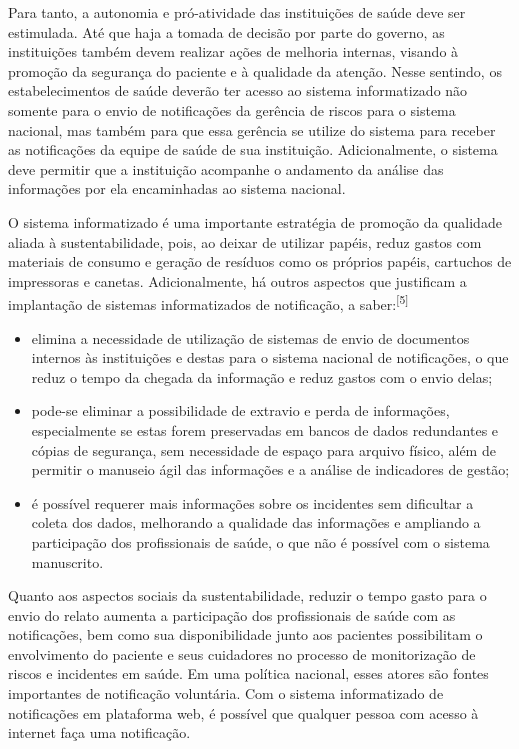 \documentclass{article}
\begin{document}
Para tanto, a autonomia e pró-atividade das instituições de saúde deve ser
estimulada. Até
que haja a tomada de decisão por parte do governo, as instituições também devem
realizar
ações de melhoria internas, visando à promoção da segurança do paciente e à
qualidade da
atenção. Nesse sentindo, os estabelecimentos de saúde deverão ter acesso ao
sistema
informatizado não somente para o envio de notificações da gerência de riscos
para o sistema
nacional, mas também para que essa gerência se utilize do sistema para receber
as
notificações da equipe de saúde de sua instituição. Adicionalmente, o sistema
deve permitir
que a instituição acompanhe o andamento da análise das informações por ela
encaminhadas ao
sistema nacional.

O sistema informatizado é uma importante estratégia de promoção da qualidade
aliada à
sustentabilidade, pois, ao deixar de utilizar papéis, reduz gastos com materiais
de consumo
e geração de resíduos como os próprios papéis, cartuchos de impressoras e
canetas.
Adicionalmente, há outros aspectos que justificam a implantação de sistemas
informatizados
de notificação, a saber:\textsuperscript{[}\textsuperscript{5}\textsuperscript{]}

\begin{itemize}
\item
elimina a necessidade de utilização de sistemas de envio de documentos internos
às
instituições e destas para o sistema nacional de notificações, o que reduz o
tempo da
chegada da informação e reduz gastos com o envio delas;

\item
pode-se eliminar a possibilidade de extravio e perda de informações,
especialmente se
estas forem preservadas em bancos de dados redundantes e cópias de segurança,
sem
necessidade de espaço para arquivo físico, além de permitir o manuseio ágil das
informações e a análise de indicadores de gestão;

\item
é possível requerer mais informações sobre os incidentes sem dificultar a coleta
dos
dados, melhorando a qualidade das informações e ampliando a participação dos
profissionais de saúde, o que não é possível com o sistema manuscrito.

\end{itemize}

Quanto aos aspectos sociais da sustentabilidade, reduzir o tempo gasto para o
envio do
relato aumenta a participação dos profissionais de saúde com as notificações,
bem como sua
disponibilidade junto aos pacientes possibilitam o envolvimento do paciente e
seus
cuidadores no processo de monitorização de riscos e incidentes em saúde. Em uma
política
nacional, esses atores são fontes importantes de notificação voluntária. Com o
sistema
informatizado de notificações em plataforma web, é possível que qualquer pessoa
com acesso à
internet faça uma notificação.
\end{document}
